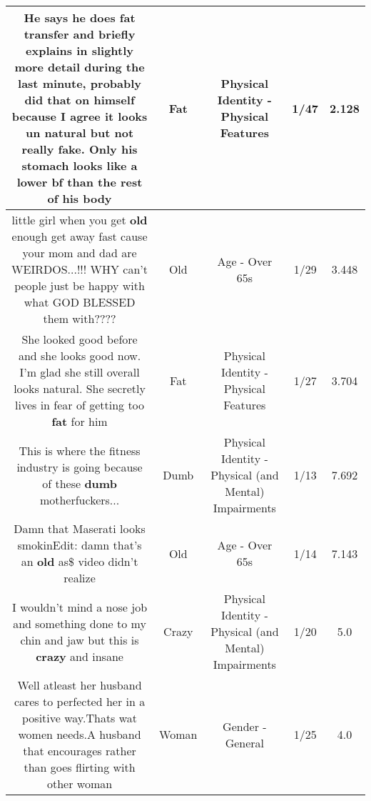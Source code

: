 \documentclass[11pt]{article}
\newlength\mylength
\begin{document}
\begin{center}
\begin{longtable}{|C{.65\mylength}|C{.30\mylength}|C{.12\mylength}|C{.12\mylength}|C{.12\mylength}|}
  \small He says he does \textbf{fat} transfer and briefly explains in slightly more detail during the last minute, probably did that on himself because I agree it looks un natural but not really fake.  Only his stomach looks like a lower bf than the rest of his body\normalsize   & Fat & Physical Identity - Physical Features & 1/47 & 2.128 \\  \hline
  \small little girl when you get \textbf{old} enough get away fast cause your mom and dad are WEIRDOS...!!! WHY can't people just be happy with what GOD BLESSED them with????\normalsize   & Old & Age - Over 65s & 1/29 & 3.448 \\  \hline
  \small She looked good before and she looks good now.  I'm glad she still overall looks natural.  She secretly lives in fear of getting too \textbf{fat} for him\normalsize   & Fat & Physical Identity - Physical Features & 1/27 & 3.704 \\  \hline
  \small This is where the fitness industry is going because of these \textbf{dumb} motherfuckers...\normalsize   & Dumb & Physical Identity - Physical (and Mental) Impairments & 1/13 & 7.692 \\  \hline
  \small Damn that Maserati looks smokinEdit: damn that's an \textbf{old} as\$ video didn't realize\normalsize   & Old & Age - Over 65s & 1/14 & 7.143 \\  \hline
  \small I wouldn't mind a nose job and something done to my chin and jaw but this is \textbf{crazy} and insane\normalsize   & Crazy & Physical Identity - Physical (and Mental) Impairments & 1/20 & 5.0 \\  \hline
  \small Well atleast her husband cares to perfected her in a positive way.Thats wat women needs.A husband that encourages rather than goes flirting with other woman\normalsize   & Woman & Gender - General & 1/25 & 4.0 \\  \hline

\end{longtable}
\end{center}
\end{document}
